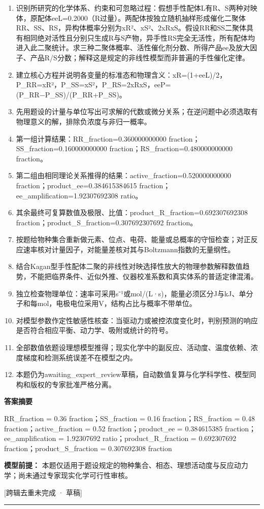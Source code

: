 \documentclass[UTF8,11pt,a4paper]{ctexart}
\begin{document}
\begin{enumerate}
\item 识别所研究的化学体系、约束和可忽略过程：假想手性配体L有R、S两种对映体，原配体eeL=0.2000（R过量）。两配体按独立随机抽样形成催化二聚体RR、SS、RS，异构体概率分别为xR²、xS²、2xRxS。假设RR和SS二聚体具有相同绝对活性且分别只生成R与S产物，异手性RS完全无活性，所有配体均进入此二聚统计。求三种二聚体概率、活性催化剂分数、所得产品ee及放大因子、产品R/S分数；解释这是规定的非线性模型而非普遍的手性催化定律。
\item 建立核心方程并说明各变量的标准态和物理含义：xR=(1+eeL)/2，P\_RR=xR²，P\_SS=xS²，P\_RS=2xRxS，eeP=(P\_RR−P\_SS)/(P\_RR+P\_SS)。
\item 先用题设的计量与单位写出可求解的代数或微分关系；在逆问题中必须选取有物理意义的解，排除负浓度与非归一概率。
\item 第一组计算结果：RR\_fraction=0.360000000000 fraction；SS\_fraction=0.160000000000 fraction；RS\_fraction=0.480000000000 fraction。
\item 第二组由相同理论关系推得的结果：active\_fraction=0.520000000000 fraction；product\_ee=0.384615384615 fraction；ee\_amplification=1.92307692308 ratio。
\item 其余最终可复算数值及极限、比值：product\_R\_fraction=0.692307692308 fraction；product\_S\_fraction=0.307692307692 fraction。
\item 按题给物种集合重新做元素、位点、电荷、能量或总概率的守恒检查；对正反应速率核对计量因子，对能量差核对其与Boltzmann指数的无量纲性。
\item 结合Kagan型手性配体二聚的非线性对映选择性放大的物理参数解释数值趋势，不能把临界条件、近似外推、仪器校准系数和真实体系的普适定律混淆。
\item 独立检查物理单位：速率可采用s⁻¹或mol/(L·s)，能量必须区分J与kJ、单分子和每mol，电极电位采用V，结构占比与概率不带单位。
\item 对模型参数作定性敏感性核查：当驱动力或被控浓度变化时，判别预测的响应是否符合相应平衡、动力学、吸附或统计的符号。
\item 全部数值依题设理想模型推得；现实化学中的副反应、活动度、温度依赖、浓度梯度和检测系统误差不在模型之内。
\item 本题仍为awaiting\_expert\_review草稿，自动数值复算与化学科学性、模型同构和版权的专家批准严格分离。
\end{enumerate}
\noindent\textbf{答案摘要}\par
RR\_fraction = 0.36 fraction；SS\_fraction = 0.16 fraction；RS\_fraction = 0.48 fraction；active\_fraction = 0.52 fraction；product\_ee = 0.384615385 fraction；ee\_amplification = 1.92307692 ratio；product\_R\_fraction = 0.692307692 fraction；product\_S\_fraction = 0.307692308 fraction\par
\noindent\textbf{模型前提：}
本题仅适用于题设规定的物种集合、相态、理想活动度与反应动力学；尚未通过专家现实化学可行性审核。\par
\noindent\textcolor{red!65!black}{[跨辑去重未完成 · 草稿]} \par
\medskip\hrule\medskip
{}
\end{document}
